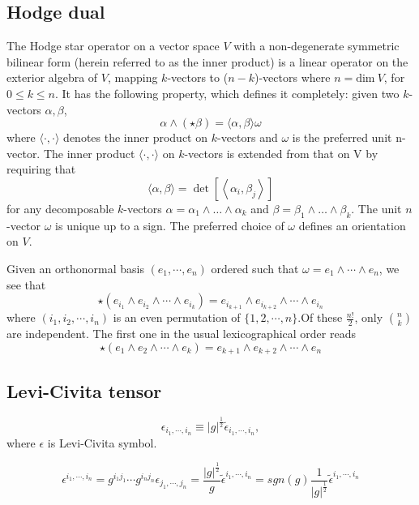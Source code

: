 \subsection{Hodge dual}
\begin{newdef}
The Hodge star operator on a vector space $V$ with a non-degenerate symmetric bilinear form (herein referred to as the inner product) is a linear operator on the exterior algebra of $V$, mapping $k$-vectors to ($n-k$)-vectors where $n = \text{dim} \ V$, for $ 0 \leq k \leq n$. It has the following property, which defines it completely: given two $k$-vectors $\alpha,\beta$,
\[\alpha \wedge (\star \beta )=\langle \alpha ,\beta \rangle \omega\]
where $\langle \cdot ,\cdot \rangle$ denotes the inner product on $k$-vectors and $\omega$ is the preferred unit n-vector.
The inner product $\langle \cdot ,\cdot \rangle$ on $k$-vectors is extended from that on V by requiring that
\[\langle \alpha ,\beta \rangle =\det \left[\left\langle \alpha _{i},\beta _{j}\right\rangle \right]\]
for any decomposable $k$-vectors $\alpha =\alpha _{1}\wedge \dots \wedge \alpha _{k}$ and $\beta =\beta _{1}\wedge \dots \wedge \beta _{k}$. The unit $n$-vector $\omega$ is unique up to a sign. The preferred choice of $\omega$ defines an orientation on $V$.
\end{newdef}
\noindent
Given an orthonormal basis $(e_{1},\cdots ,e_{n})$ ordered such that $\omega =e_{1}\wedge \cdots \wedge e_{n}$, we see that
\[\star (e_{i_{1}}\wedge e_{i_{2}}\wedge \cdots \wedge e_{i_{k}})=e_{i_{k+1}}\wedge e_{i_{k+2}}\wedge \cdots \wedge e_{i_{n}}\]
where $(i_{1},i_{2},\cdots ,i_{n})$ is an even permutation of $\{1,2,\cdots,n\}$.Of these $\frac{n!}{2}$, only $n \choose k$ are independent. The first one in the usual lexicographical order reads
\[\star (e_{1}\wedge e_{2}\wedge \cdots \wedge e_{k})=e_{k+1}\wedge e_{k+2}\wedge \cdots \wedge e_{n}\]

\subsection{Levi-Civita tensor}
\begin{newdef}
\[\epsilon_{i_1,\cdots,i_n} \equiv |g|^{\frac{1}{2}} \tilde{\epsilon}_{i_1,\cdots,i_n} ,\]
where $\epsilon$ is Levi-Civita symbol.
\end{newdef} 
\begin{newprop}
\[\epsilon^{i_1,\cdots,i_n} = g^{i_1j_1} \cdots g^{i_nj_n} \epsilon_{j_1,\cdots,j_n} = \frac{|g|^{\frac{1}{2}}}{g} \tilde{\epsilon}^{i_1,\cdots,i_n} = sgn(g) \frac{1}{|g|^{\frac{1}{2}}} \tilde{\epsilon}^{i_1,\cdots,i_n}\]
\end{newprop}

